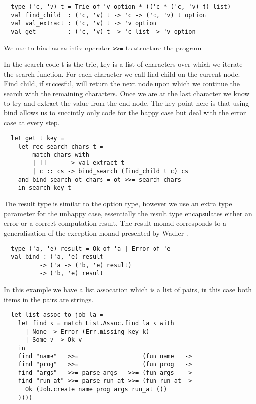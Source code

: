 \documentclass[a4paper,10pt]{article}
\theoremstyle{definition}
\begin{document}
\begin{verbatim}
  type ('c, 'v) t = Trie of 'v option * (('c * ('c, 'v) t) list)
  val find_child  : ('c, 'v) t -> 'c -> ('c, 'v) t option
  val val_extract : ('c, 'v) t -> 'v option
  val get         : ('c, 'v) t -> 'c list -> 'v option
\end{verbatim}

We use to bind as as infix operator \texttt{>>=} to structure the program.

In the search code t is the trie, key is a list of characters over which
we iterate the search function. For each character we call find child on
the current node. Find child, if succesful, will return the next node
upon which we continue the search with the remaining characters. Once we
are at the last character we know to try and extract the value from the end
node. The key point here is that using bind allows us to succintly only code
for the happy case but deal with the error case at every step.

\begin{verbatim}
  let get t key =
    let rec search chars t =
        match chars with
        | []      -> val_extract t
        | c :: cs -> bind_search (find_child t c) cs
    and bind_search ot chars = ot >>= search chars
    in search key t
\end{verbatim}

The result type is similar to the option type, however we use an extra type
parameter for the unhappy case, essentially the result type encapsulates 
either an error or a correct computation result. The result monad
corresponds to a generalisation of the exception monad presented by Wadler \cite{wadler1995monads}.

\begin{verbatim}
  type ('a, 'e) result = Ok of 'a | Error of 'e
  val bind : ('a, 'e) result
          -> ('a -> ('b, 'e) result)
          -> ('b, 'e) result
\end{verbatim}

In this example we have a list assocation which is a list of pairs, in this case both
items in the pairs are strings.

\begin{verbatim}
  let list_assoc_to_job la =
    let find k = match List.Assoc.find la k with
      | None -> Error (Err.missing_key k)
      | Some v -> Ok v
    in
    find "name"   >>=                  (fun name   ->
    find "prog"   >>=                  (fun prog   ->
    find "args"   >>= parse_args   >>= (fun args   ->
    find "run_at" >>= parse_run_at >>= (fun run_at ->
      Ok (Job.create name prog args run_at ())
    ))))
\end{verbatim}
\end{document}

